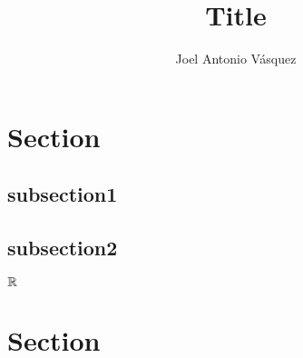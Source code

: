 \documentclass{amsbook}
\author{Joel Antonio Vásquez}
\title{Title}
\date{} %
\begin{document}
\maketitle

\tableofcontents

\section{Section}
\subsection{subsection1}
\subsection{subsection2}
\begin{definition*}
  $\mathbb R$
\end{definition*}

\begin{lemma}
\end{lemma}
\section{Section}

\begin{theorem}
\end{theorem}

\begin{proposition*}
\end{proposition*}

\begin{remark*}
\end{remark*}
\end{document}
